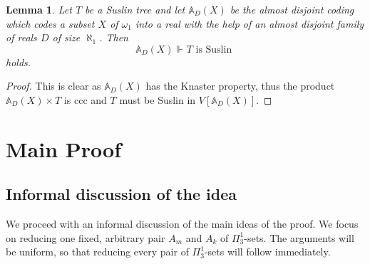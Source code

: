 \documentclass[a4paper,11pt]{article}
\newtheorem{lemma}[theorem]{Lemma}
\begin{document}
\begin{lemma}\label{a.d.coding preserves Suslin trees}
 Let $T$ be a Suslin tree and let $\mathbb{A}_D(X)$ be the almost disjoint coding which codes
 a subset $X$ of $\omega_1$ into a real with the help of an almost disjoint family
 of reals $D$ of size $\aleph_1$. Then $$\mathbb{A}_{D}(X) \Vdash_{} T \text{ is Suslin }$$
 holds.
\end{lemma}
\begin{proof}
 This is clear as $\mathbb{A}_{D}(X)$ has the Knaster property, thus the product $\mathbb{A}_{D}(X) \times T$ is ccc and $T$ must be Suslin in $V[{\mathbb{A}_{D}(X)}]$. 
\end{proof}



\section{Main Proof}
\subsection{Informal discussion of the idea}
We proceed with an informal discussion of the main ideas of the proof. We focus on reducing one fixed, arbitrary pair $A_m$ and $A_k$ of $\Pi^1_3$-sets. The arguments will be uniform, so that reducing every pair of $\Pi^1_3$-sets will follow immediately.
\end{document}
